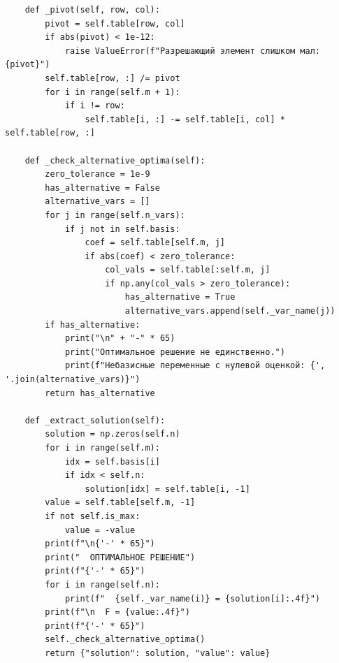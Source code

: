 \documentclass[oneside,a4paper,14pt]{extarticle}
\begin{document}
\begin{verbatim}
    def _pivot(self, row, col):
        pivot = self.table[row, col]
        if abs(pivot) < 1e-12:
            raise ValueError(f"Разрешающий элемент слишком мал: {pivot}")
        self.table[row, :] /= pivot
        for i in range(self.m + 1):
            if i != row:
                self.table[i, :] -= self.table[i, col] * self.table[row, :]

    def _check_alternative_optima(self):
        zero_tolerance = 1e-9
        has_alternative = False
        alternative_vars = []
        for j in range(self.n_vars):
            if j not in self.basis:
                coef = self.table[self.m, j]
                if abs(coef) < zero_tolerance:
                    col_vals = self.table[:self.m, j]
                    if np.any(col_vals > zero_tolerance):
                        has_alternative = True
                        alternative_vars.append(self._var_name(j))
        if has_alternative:
            print("\n" + "-" * 65)
            print("Оптимальное решение не единственно.")
            print(f"Небазисные переменные с нулевой оценкой: {', '.join(alternative_vars)}")
        return has_alternative

    def _extract_solution(self):
        solution = np.zeros(self.n)
        for i in range(self.m):
            idx = self.basis[i]
            if idx < self.n:
                solution[idx] = self.table[i, -1]
        value = self.table[self.m, -1]
        if not self.is_max:
            value = -value
        print(f"\n{'-' * 65}")
        print("  ОПТИМАЛЬНОЕ РЕШЕНИЕ")
        print(f"{'-' * 65}")
        for i in range(self.n):
            print(f"  {self._var_name(i)} = {solution[i]:.4f}")
        print(f"\n  F = {value:.4f}")
        print(f"{'-' * 65}")
        self._check_alternative_optima()
        return {"solution": solution, "value": value}


\end{verbatim}
\end{document}
